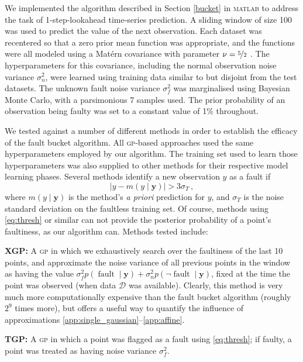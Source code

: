 \documentclass[twoside]{article}
\newcommand{\given}{\!\ensuremath{\mid}\!}
\newcommand{\cm}[1]{\ensuremath{\mathcal{#1}}}
\newcommand{\bm}[1]{\ensuremath{\mathbf{#1}}}
\newcommand{\data}{\ensuremath{\cm{D}}}
\newcommand{\acro}[1]{\textsc{\MakeLowercase{#1}}}
\newcommand{\vect}[1]{\bm{#1}}
\newcommand{\vy}{\vect{y}}
\newcommand{\p}[2]{p(#1\given#2)}
\newcommand{\mean}[2]{{m}(#1\given#2)}
\DeclareMathOperator{\fault}{fault}
\begin{document}
We implemented the algorithm described in Section \ref{bucket} in
\textsc{matlab} to address the task of 1-step-lookahead time-series
prediction.  A sliding window of size 100 was used to predict the
value of the next observation.  Each dataset was recentered so that a
zero prior mean function was appropriate, and the functions were all
modeled using a Mat\'{e}rn covariance with parameter $\nu =
\nicefrac{5}{2}$ \citep{gpml}.  The hyperparameters for this
covariance, including the normal observation noise variance
$\sigma_n^2$, were learned using training data similar to but disjoint from the test datasets.  The unknown fault noise variance $\sigma_f^2$
was marginalised using Bayesian Monte Carlo, with a parsimonious 7 samples used.  The prior probability of an observation being faulty was
set to a constant value of 1\% throughout.

We tested against a number of different methods in order to establish the efficacy of the fault bucket algorithm. All \acro{gp}-based approaches used the same hyperparameters employed by our algorithm. The training set used to learn those hyperparameters was also supplied to other methods for their respective model learning phases. Several methods identify a new observation $y$ as a fault if
\begin{equation}\label{eq:thresh}
 \bigl\lvert y-\mean{y}{\vy} \bigr\rvert > 3\sigma_T\,,
\end{equation}
where $\mean{y}{\vy}$ is the method's \emph{a priori} prediction for $y$, and $\sigma_T$ is the noise standard deviation on the faultless training set. Of course, methods using \eqref{eq:thresh} or similar can not provide the posterior probability of a point's faultiness, as our algorithm can. Methods tested include:

{\bf XGP:}
A  \acro{gp} in which we exhaustively search over the faultiness of the last 10 points, and approximate the noise variance of all previous points in the window as having the value $\sigma_f^2 \p{\fault}{\vy} + \sigma_n^2 \p{\neg\fault}{\vy}$, fixed at the time the point was observed (when data $\data$ was available). Clearly, this method is very much more computationally expensive than the fault bucket algorithm (roughly $2^9$ times more), but offers a useful way to quantify the influence of approximations \ref{app:single_gaussian}--\ref{app:affine}.

{\bf TGP:}
A \acro{gp} in which a point was flagged as a fault using \eqref{eq:thresh}; if faulty, a point was treated as having noise variance $\sigma_f^2$.
\end{document}

